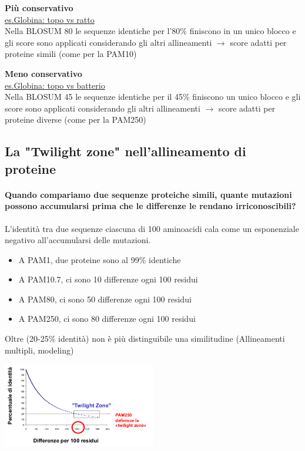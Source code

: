 \documentclass{article}
\begin{document}
\begin{minipage}[t]{.4\textwidth}
    \raggedright
    \textbf{Più conservativo}\\
    \underline{es.Globina: topo vs ratto}\\
    Nella BLOSUM 80 le sequenze
    identiche per l'80\% finiscono in un
    unico blocco e gli score sono
    applicati considerando gli altri
    allineamenti $\rightarrow$ score adatti per
    proteine simili (come per la PAM10)
    \end{minipage}%
    \begin{minipage}[t]{.5\textwidth}
        \raggedleft
        \textbf{Meno conservativo}\\
        \underline{es.Globina: topo vs batterio}\\
        Nella BLOSUM 45 le sequenze
        identiche per il 45\% finiscono un unico
        blocco e gli score sono applicati
        considerando gli altri allineamenti $\rightarrow$
        score adatti per proteine diverse
        (come per la PAM250)
    \end{minipage}
\subsection{La "Twilight zone" nell'allineamento di proteine}
\paragraph{Quando compariamo due sequenze proteiche simili,
quante mutazioni possono accumularsi prima che le
differenze le rendano irriconoscibili?}
L'identità tra due sequenze ciascuna di 100 aminoacidi cala
come un esponenziale negativo all'accumularsi delle
mutazioni.\\
\begin{itemize}
    \item A PAM1, due proteine sono al 99\% identiche
    \item A PAM10.7, ci sono 10 differenze ogni 100 residui
    \item A PAM80, ci sono 50 differenze ogni 100 residui
    \item A PAM250, ci sono 80 differenze ogni 100 residui
\end{itemize}
Oltre (20-25\% identità) non è più distinguibile una
similitudine (Allineamenti multipli, modeling)
\begin{center}
    \includegraphics[width=0.5\textwidth]{figures/twilight.png}
\end{center}
\end{document}
